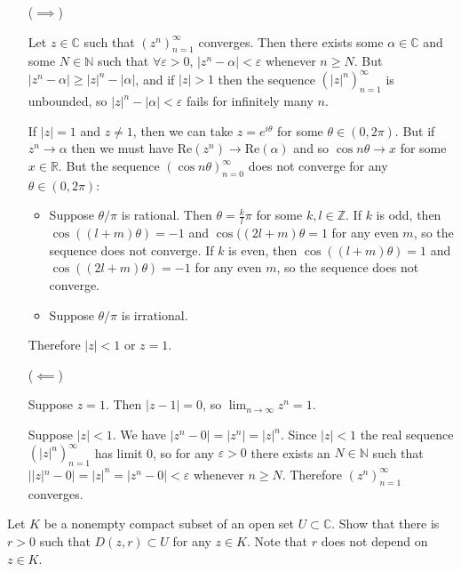 \documentclass{article}
\newcounter{Problem}
\newenvironment{Problem}{\begin{Exercise}[name={Problem},
                                          counter={Problem}]}
                        {\end{Exercise}}
\begin{document}
\begin{Answer}
  \begin{itemize}
    \item[($\implies$)]{
      Let $z \in \mathbb{C}$ such that $(z^n)_{n=1}^\infty$ converges.
      Then there exists some $\alpha \in \mathbb{C}$ and some
      $N \in \mathbb{N}$ such that $\forall \varepsilon > 0$,
      $|z^n - \alpha| < \varepsilon$ whenever $n \geq N$.
      But $|z^n - \alpha| \geq |z|^n - |\alpha|$, and if
      $|z| > 1$ then the sequence $(|z|^n)_{n=1}^\infty$ is unbounded,
      so $|z|^n - |\alpha| < \varepsilon$ fails
      for infinitely many $n$.

      If $|z| = 1$ and $z \neq 1$, then we can take $z = e^{i\theta}$
      for some $\theta \in (0, 2 \pi)$. But if
      $z^n \to \alpha$ then we must have
      $\mathrm{Re}(z^n) \to \mathrm{Re}(\alpha)$ and so
      $\cos n\theta \to x$ for some $x \in \mathbb{R}$.
      But the sequence $(\cos n \theta)_{n=0}^\infty$ does
      not converge for any $\theta \in (0, 2 \pi)$:
      \begin{itemize}
        \item{
          Suppose $\theta / \pi$ is rational. Then
          $\theta = \frac{k}{l} \pi$ for some
          $k, l \in \mathbb{Z}$. If $k$ is odd, then
          $\cos ((l + m) \theta) = -1$ and
          $\cos ((2l + m) \theta = 1$ for any even $m$,
          so the sequence does not converge. If $k$ is
          even, then $\cos ((l + m) \theta) = 1$ and
          $\cos ((2l + m) \theta) = -1$ for any even
          $m$, so the sequence does not converge.
        }
        \item{
          Suppose $\theta / \pi$ is irrational.
        }
      \end{itemize}

      Therefore $|z| < 1$ or $z = 1$.
    }
    \item[($\impliedby$)]{
      Suppose $z = 1$. Then $|z - 1| = 0$, so
      $\lim_{n \to \infty} z^n = 1$.

      Suppose $|z| < 1$. We have
      $|z^n - 0| = |z^n| = |z|^n$. Since $|z| < 1$
      the real sequence $(|z|^n)_{n=1}^\infty$ has limit
      0, so for any $\varepsilon > 0$ there exists an
      $N \in \mathbb{N}$ such that $||z|^n - 0| = |z|^n = |z^n - 0| < \varepsilon$
      whenever $n \geq N$. Therefore $(z^n)_{n=1}^\infty$ converges.
    }
  \end{itemize}
\end{Answer}

\begin{Problem}
  Let $K$ be a nonempty compact subset of an open set
  $U  \subset \mathbb{C}$. Show that there is $r > 0$
  such that $D(z, r) \subset U$ for any $z \in K$.
  Note that $r$ does not depend on $z \in K$.
\end{Problem}
\end{document}
